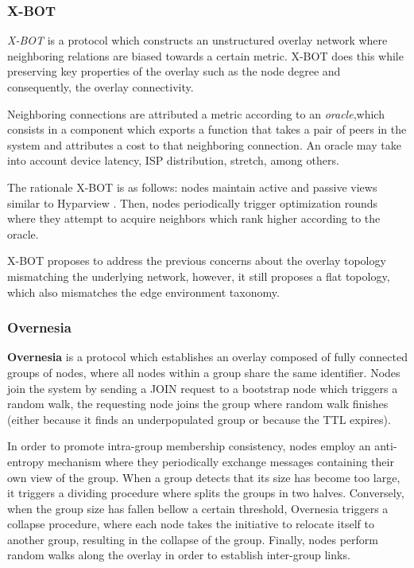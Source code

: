 \subsubsection*{X-BOT}

\textit{X-BOT} \cite{leitao2012x} is a protocol which constructs an unstructured overlay network where neighboring relations are biased towards a certain metric. X-BOT does this while preserving key properties of the overlay such as the node degree and consequently, the overlay connectivity.

Neighboring connections are attributed a metric according to an \textit{oracle},which consists in a component which exports a function that takes a pair of peers in the system and attributes a cost to that neighboring connection. An oracle may take into account device latency, ISP distribution, stretch, among others. 

The rationale X-BOT is as follows: nodes maintain active and passive views similar to Hyparview \cite{Hyparview}. Then, nodes periodically trigger optimization rounds where they attempt to acquire neighbors which rank higher according to the oracle.

X-BOT proposes to address the previous concerns about the overlay topology mismatching the underlying network, however, it still proposes a flat topology, which also mismatches the edge environment taxonomy. 

\subsubsection*{Overnesia}

\textbf{Overnesia} \cite{leitao2014overnesia} is a protocol which establishes an overlay composed of fully connected groups of nodes, where all nodes within a group share the same identifier. Nodes join the system by sending a JOIN request to a bootstrap node which triggers a random walk, the requesting node joins the group where random walk finishes (either because it finds an underpopulated group or because the TTL expires). 

In order to promote intra-group membership consistency, nodes employ an anti-entropy mechanism where they periodically exchange messages containing their own view of the group. When a group detects that its size has become too large, it triggers a dividing procedure where splits the groups in two halves. Conversely, when the group size has fallen bellow a certain threshold, Overnesia triggers a collapse procedure, where each node takes the initiative to relocate itself to another group, resulting in the collapse of the group. Finally, nodes perform random walks along the overlay in order to establish inter-group links.

